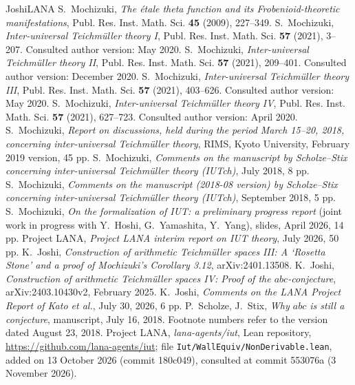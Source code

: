 \documentclass[11pt]{article}
\theoremstyle{plain}
\theoremstyle{definition}
\theoremstyle{remark}
\begin{document}
\begin{thebibliography}{JoshiLANA}
 S.~Mochizuki, \emph{The \'etale theta function and its
 Frobenioid-theoretic manifestations}, Publ. Res. Inst. Math. Sci. \textbf{45} (2009),
 227--349.
 S.~Mochizuki, \emph{Inter-universal Teichm\"uller theory I},
 Publ. Res. Inst. Math. Sci. \textbf{57} (2021), 3--207.
 Consulted author version: May 2020.
 S.~Mochizuki, \emph{Inter-universal Teichm\"uller theory II},
 Publ. Res. Inst. Math. Sci. \textbf{57} (2021), 209--401.
 Consulted author version: December 2020.
 S.~Mochizuki, \emph{Inter-universal Teichm\"uller theory III},
 Publ. Res. Inst. Math. Sci. \textbf{57} (2021), 403--626.
 Consulted author version: May 2020.
 S.~Mochizuki, \emph{Inter-universal Teichm\"uller theory IV},
 Publ. Res. Inst. Math. Sci. \textbf{57} (2021), 627--723.
 Consulted author version: April 2020.
 S.~Mochizuki, \emph{Report on discussions, held during the period
 March 15--20, 2018, concerning inter-universal Teichm\"uller theory}, RIMS, Kyoto
 University, February 2019 version, 45 pp.
 S.~Mochizuki, \emph{Comments on the manuscript by Scholze--Stix
 concerning inter-universal Teichm\"uller theory (IUTch)}, July 2018, 8 pp.
 S.~Mochizuki, \emph{Comments on the manuscript (2018-08 version)
 by Scholze--Stix concerning inter-universal Teichm\"uller theory (IUTch)}, September 2018,
 5 pp.
 S.~Mochizuki, \emph{On the formalization of IUT: a preliminary
 progress report} (joint work in progress with Y.~Hoshi, G.~Yamashita, Y.~Yang),
 slides, April 2026, 14 pp.
 Project LANA, \emph{Project LANA interim report on IUT theory},
 July 2026, 50 pp.
 K.~Joshi, \emph{Construction of arithmetic Teichm\"uller
 spaces III: A `Rosetta Stone' and a proof of Mochizuki's Corollary 3.12},
 arXiv:2401.13508.
 K.~Joshi, \emph{Construction of arithmetic Teichm\"uller
 spaces IV: Proof of the $abc$-conjecture}, arXiv:2403.10430v2, February 2025.
 K.~Joshi, \emph{Comments on the LANA Project Report of
 Kato et al.}, July 30, 2026, 6 pp.
 P.~Scholze, J.~Stix, \emph{Why $abc$ is still a conjecture},
 manuscript, July 16, 2018. Footnote numbers refer to the version dated August 23, 2018.
 Project LANA, \emph{lana-agents/iut}, Lean repository,
 \url{https://github.com/lana-agents/iut}; file \texttt{Iut/WallEquiv/NonDerivable.lean},
 added on 13 October 2026 (commit 180c049), consulted at commit 553076a (3 November 2026).

\end{thebibliography}
\end{document}
